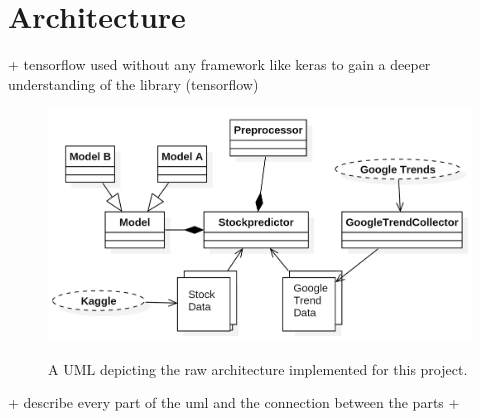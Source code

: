 \section{Architecture}
\label{sec:architecture}
+ tensorflow used without any framework like keras to gain a deeper understanding of the library (tensorflow)
\begin{figure}[!ht]
	\caption{A UML depicting the raw architecture implemented for this project. }
	\includegraphics[width=0.95\linewidth]{images/architecture.png}
	\label{fig:architecture}
\end{figure}
+ describe every part of the uml and the connection between the parts
+ 